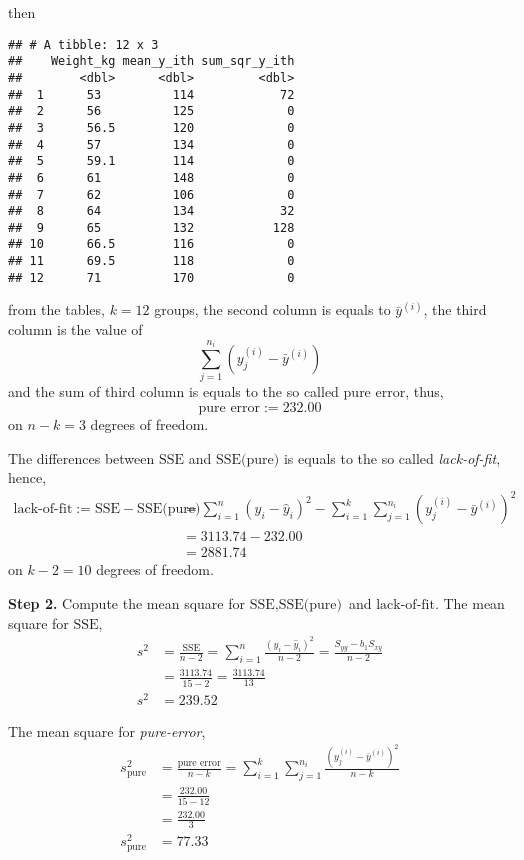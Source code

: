 \documentclass[
]{article}
\begin{document}
then

\begin{verbatim}
## # A tibble: 12 x 3
##    Weight_kg mean_y_ith sum_sqr_y_ith
##        <dbl>      <dbl>         <dbl>
##  1      53          114            72
##  2      56          125             0
##  3      56.5        120             0
##  4      57          134             0
##  5      59.1        114             0
##  6      61          148             0
##  7      62          106             0
##  8      64          134            32
##  9      65          132           128
## 10      66.5        116             0
## 11      69.5        118             0
## 12      71          170             0
\end{verbatim}

from the tables, \(k = 12\) groups, the second column is equals to
\(\bar{y}^{(i)}\), the third column is the value of
\[\sum_{j = 1}^{n_i}(y^{(i)}_j - \bar{y}^{(i)})\] and the sum of third
column is equals to the so called \(\text{pure error}\), thus, \[
\text{pure error} := 232.00
\] on \(n - k = 3\) degrees of freedom.

The differences between \(\text{SSE}\) and \(\text{SSE(pure)}\) is
equals to the so called \emph{lack-of-fit}, hence, \[
\begin{aligned}
\text{lack-of-fit} := \text{SSE} - \text{SSE(pure)} &=
\sum_{i = 1}^{n}(y_i - \hat{y}_i)^2 -
\sum_{i = 1}^k \sum_{j = 1}^{n_i}(y^{(i)}_j - \bar{y}^{(i)})^2 \\
&= 3113.74 - 232.00 \\
&= 2881.74
\end{aligned}
\] on \(k - 2 = 10\) degrees of freedom.

\textbf{Step 2.} Compute the mean square for
\(\text{SSE}, \text{SSE(pure)}\) and \(\text{lack-of-fit}\). The mean
square for \(\text{SSE}\), \[
\begin{aligned}
s^2 &= \frac{\text{SSE}}{n - 2} = 
\sum_{i = 1}^{n} \frac{(y_i - \hat{y}_i)^2}{n - 2} =
\frac{S_{yy} - b_1S_{xy}}{n - 2} \\
&= \frac{3113.74}{15 - 2} = \frac{3113.74}{13} \\
s^2 &= 239.52
\end{aligned}
\]

The mean square for \emph{pure-error}, \[
\begin{aligned}
s^2_{\text{pure}} &= \frac{\text{pure error}}{n - k} =
\sum_{i = 1}^{k}\sum_{j = 1}^{n_i} \frac{(y^{(i)}_j - 
\bar{y}^{(i)})^2}{n - k} \\
&= \frac{232.00}{15 - 12} \\ &= \frac{232.00}{3} \\
s^2_{\text{pure}} &= 77.33
\end{aligned}
\]
\end{document}
